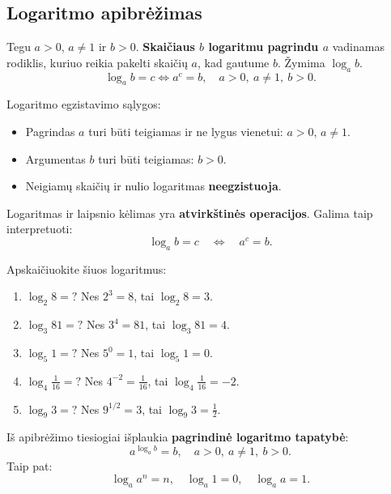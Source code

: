 \subsection{Logaritmo apibrėžimas}

\begin{definition}
Tegu $a > 0$, $a \neq 1$ ir $b > 0$. \textbf{Skaičiaus $b$ logaritmu pagrindu $a$} vadinamas rodiklis, kuriuo reikia pakelti skaičių $a$, kad gautume $b$. Žymima $\log_a b$.
\[
\log_a b = c \iff a^c = b, \quad a > 0,\ a \neq 1,\ b > 0.
\]
\end{definition}

\begin{remark}
Logaritmo egzistavimo sąlygos:
\begin{itemize}
    \item Pagrindas $a$ turi būti teigiamas ir ne lygus vienetui: $a > 0$, $a \neq 1$.
    \item Argumentas $b$ turi būti teigiamas: $b > 0$.
    \item Neigiamų skaičių ir nulio logaritmas \textbf{neegzistuoja}.
\end{itemize}
\end{remark}

Logaritmas ir laipsnio kėlimas yra \textbf{atvirkštinės operacijos}. Galima taip interpretuoti:
\[
\log_a b = c \quad \Longleftrightarrow \quad a^c = b.
\]

\begin{example}
Apskaičiuokite šiuos logaritmus:
\begin{enumerate}[label=\alph*)]
    \item $\log_2 8 = ?$ \quad Nes $2^3 = 8$, tai $\log_2 8 = 3$.
    \item $\log_3 81 = ?$ \quad Nes $3^4 = 81$, tai $\log_3 81 = 4$.
    \item $\log_5 1 = ?$ \quad Nes $5^0 = 1$, tai $\log_5 1 = 0$.
    \item $\log_4 \frac{1}{16} = ?$ \quad Nes $4^{-2} = \frac{1}{16}$, tai $\log_4 \frac{1}{16} = -2$.
    \item $\log_9 3 = ?$ \quad Nes $9^{1/2} = 3$, tai $\log_9 3 = \frac{1}{2}$.
\end{enumerate}
\end{example}

\begin{tcolorbox}[title=Pagrindinė logaritmo tapatybė]
Iš apibrėžimo tiesiogiai išplaukia \textbf{pagrindinė logaritmo tapatybė}:
\[
a^{\log_a b} = b, \quad a > 0,\ a \neq 1,\ b > 0.
\]
Taip pat:
\[
\log_a a^n = n, \quad \log_a 1 = 0, \quad \log_a a = 1.
\]
\end{tcolorbox}

